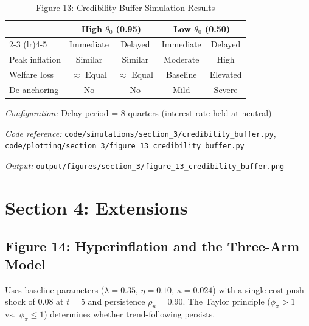 \documentclass[11pt]{article}
\begin{document}
\begin{table}[htbp]
\centering
\caption{Figure 13: Credibility Buffer Simulation Results}
\label{tab:credibility_buffer}
\begin{threeparttable}
\begin{tabular}{lcccc}
\toprule
 & \multicolumn{2}{c}{High $\theta_0$ (0.95)} & \multicolumn{2}{c}{Low $\theta_0$ (0.50)} \\
\cmidrule(lr){2-3} \cmidrule(lr){4-5}
 & Immediate & Delayed & Immediate & Delayed \\
\midrule
Peak inflation & Similar & Similar & Moderate & High \\
Welfare loss & $\approx$ Equal & $\approx$ Equal & Baseline & Elevated \\
De-anchoring & No & No & Mild & Severe \\
\bottomrule
\end{tabular}
\begin{tablenotes}
\small
\item \textit{Configuration:} Delay period = 8 quarters (interest rate held at neutral)
\item \textit{Code reference:} \texttt{code/simulations/section\_3/credibility\_buffer.py}, \texttt{code/plotting/section\_3/figure\_13\_credibility\_buffer.py}
\item \textit{Output:} \texttt{output/figures/section\_3/figure\_13\_credibility\_buffer.png}
\end{tablenotes}
\end{threeparttable}
\end{table}

\section{Section 4: Extensions}
\label{sec:extensions}

\subsection{Figure 14: Hyperinflation and the Three-Arm Model}

Uses baseline parameters ($\lambda = 0.35$, $\eta = 0.10$, $\kappa = 0.024$) with a single cost-push shock of $0.08$ at $t=5$ and persistence $\rho_u = 0.90$. The Taylor principle ($\phi_\pi > 1$ vs.\ $\phi_\pi \leq 1$) determines whether trend-following persists.
\end{document}
